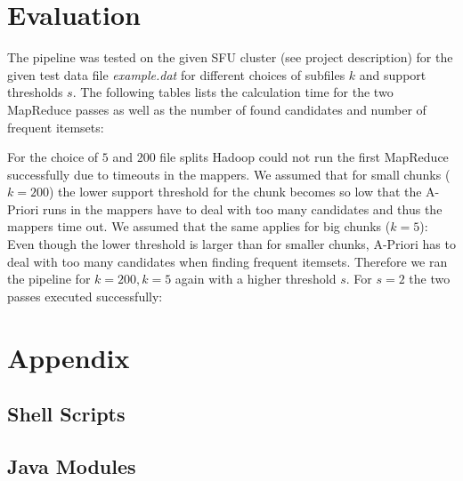 \documentclass[a4paper,ngerman]{scrartcl}
\begin{document}
\section{Evaluation}
The pipeline was tested on the given SFU cluster (see project description) for the given test data file \textit{example.dat} for different choices of subfiles $k$ and support thresholds $s$. The following tables lists the calculation time for the two MapReduce passes as well as the number of found candidates and number of frequent itemsets:
\begin{center}
\centering
\hspace*{-4.4cm}
\hspace*{-4.4cm}
\end{center}
For the choice of $5$ and $200$ file splits Hadoop could not run the first MapReduce successfully due to timeouts in the mappers. We assumed that for small chunks ($k=200$) the lower support threshold for the chunk becomes so low that the A-Priori runs in the mappers have to deal with too many candidates and thus the mappers time out. We assumed that the same applies for big chunks ($k=5$): Even though the lower threshold is larger than for smaller chunks, A-Priori has to deal with too many candidates when finding frequent itemsets. Therefore we ran the pipeline for $k=200, k=5$ again with a higher threshold $s$. For $s=2$ the two passes executed successfully:
\begin{center}
\centering
\hspace*{-4.4cm}
\hspace*{-4.4cm}
\end{center}

\section{Appendix}
\subsection{Shell Scripts}\label{scripts}
\subsection{Java Modules}\label{java}
\end{document}
